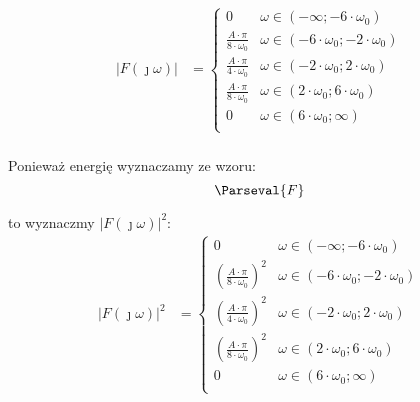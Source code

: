 \begin{task}
\begin{figure}[H]
\begin{tikzpicture}
	\end{tikzpicture}  
\end{figure}



\begin{align*}
\left|F(\jmath \omega)\right| &= \begin{cases}
0 & \omega \in \left( -\infty; -6 \cdot \omega_0 \right) \\
\frac{A \cdot \pi}{8 \cdot \omega_0} & \omega \in \left(-6 \cdot \omega_0; -2 \cdot \omega_0 \right) \\
\frac{A \cdot \pi}{4 \cdot \omega_0} & \omega \in \left(-2 \cdot \omega_0; 2 \cdot \omega_0 \right) \\
\frac{A \cdot \pi}{8 \cdot \omega_0} & \omega \in \left(2 \cdot \omega_0; 6 \cdot \omega_0 \right) \\
0 & \omega \in \left(6 \cdot \omega_0; \infty \right) \\
\end{cases}\\
\end{align*}

Ponieważ energię wyznaczamy ze wzoru:
\begin{equation}
\Parseval{F}
\end{equation}

to wyznaczmy $\left|F(\jmath \omega)\right|^2$:
\begin{align*}
\left|F(\jmath \omega)\right|^2 &= \begin{cases}
0 & \omega \in \left( -\infty; -6 \cdot \omega_0 \right) \\
\left(\frac{A \cdot \pi}{8 \cdot \omega_0}\right)^2 & \omega \in \left(-6 \cdot \omega_0; -2 \cdot \omega_0 \right) \\
\left(\frac{A \cdot \pi}{4 \cdot \omega_0}\right)^2 & \omega \in \left(-2 \cdot \omega_0; 2 \cdot \omega_0 \right) \\
\left(\frac{A \cdot \pi}{8 \cdot \omega_0}\right)^2 & \omega \in \left(2 \cdot \omega_0; 6 \cdot \omega_0 \right) \\
0 & \omega \in \left(6 \cdot \omega_0; \infty \right) \\
\end{cases}\\
\end{align*}


\end{task}

